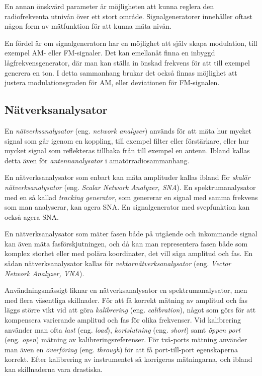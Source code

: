 En annan önskvärd parameter är möjligheten att kunna reglera den radiofrekventa
utnivån över ett stort område.
Signalgeneratorer innehåller oftast någon form av mätfunktion för att kunna
mäta nivån.

En fördel är om signalgeneratorn har en möjlighet att själv skapa modulation,
till exempel AM- eller FM-signaler.
Det kan emellanåt finna en inbyggd lågfrekvensgenerator, där man kan ställa in
önskad frekvens för att till exempel generera en ton.
I detta sammanhang brukar det också finnas möjlighet att justera
modulationsgraden för AM, eller deviationen för FM-signalen.

\subsection{Nätverksanalysator}

En \emph{nätverksanalysator} (eng. \emph{network analyser}) används för att
mäta hur mycket signal som går igenom en koppling, till exempel filter eller
förstärkare, eller hur mycket signal som reflekteras tillbaka från till exempel
en antenn.
Ibland kallas detta även för \emph{antennanalysator} i amatörradiosammanhang.

En nätverksanalysator som enbart kan mäta amplituder kallas ibland för
\emph{skalär nätverksanalysator} (eng. \emph{Scalar Network Analyzer, SNA}).
En spektrumanalysator med en så kallad \emph{tracking generator}, som genererar
en signal med samma frekvens som man analyserar, kan agera SNA.
En signalgenerator med svepfunktion kan också agera SNA.

En nätverksanalysator som mäter fasen både på utgående och inkommande signal
kan även mäta fasförskjutningen, och då kan man representera fasen både som
komplex storhet eller med polära koordinater, det vill säga amplitud och fas.
En sådan nätverksanalysator kallas för \emph{vektornätverksanalysator} (eng.
\emph{Vector Network Analyzer, VNA}).

Användningsmässigt liknar en nätverksanalysator en spektrumanalysator, men
med flera väsentliga skillnader.
För att få korrekt mätning av amplitud och fas läggs större vikt vid att göra
\emph{kalibrering} (eng. \emph{calibration}), något som görs för att kompensera
varierande amplitud och fas för olika frekvenser.
Vid kalibrering använder man ofta \emph{last} (eng. \emph{load}),
\emph{kortslutning} (eng. \emph{short}) samt \emph{öppen port} (eng.
\emph{open}) mätning av kalibreringsreferenser.
För två-ports mätning använder man även en \emph{överföring} (eng.
\emph{through}) för att få port-till-port egenskaperna korrekt.
Efter kalibrering av instrumentet så korrigeras mätningarna, och ibland kan
skillnaderna vara drastiska.


